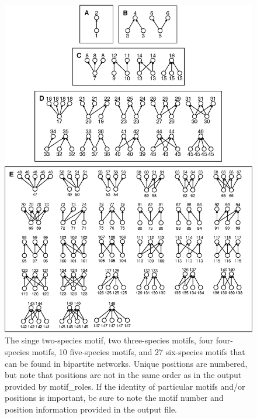 \documentclass[12pt]{article}
\begin{document}
	\begin{figure}[h!]
		\label{bipartite_motifs}
		\caption{The singe two-species motif, two three-species motifs, four four-species motifs, 10 five-species motifs, and 27 six-species motifs that can be found in bipartite networks. Unique positions are numbered, but note that positions are not in the same order as in the output provided by motif\_roles. If the identity of particular motifs and/or positions is important, be sure to note the motif number and position information provided in the output file.}
		\includegraphics*[width=\textwidth]{bipartite_motifs.eps}
	\end{figure}



\end{document}
